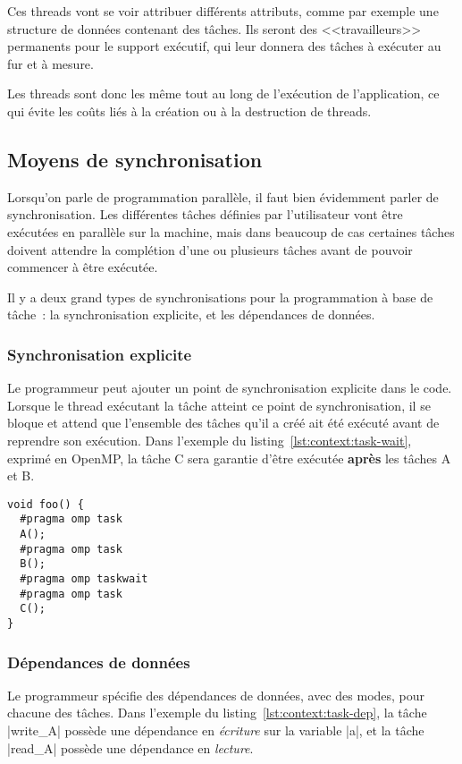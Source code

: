 Ces threads vont se voir attribuer différents attributs, comme par exemple une structure de données contenant des tâches.
Ils seront des <<travailleurs>> permanents pour le support exécutif, qui leur donnera des tâches à exécuter au fur et à mesure.

Les threads sont donc les même tout au long de l'exécution de l'application, ce qui évite les coûts liés à la création ou à la destruction de threads. 


\subsection{Moyens de synchronisation}

Lorsqu'on parle de programmation parallèle, il faut bien évidemment parler de synchronisation.
Les différentes tâches définies par l'utilisateur vont être exécutées en parallèle sur la machine, mais dans beaucoup de cas certaines tâches doivent attendre la complétion d'une ou plusieurs tâches avant de pouvoir commencer à être exécutée.

Il y a deux grand types de synchronisations pour la programmation à base de tâche~: la synchronisation explicite, et les dépendances de données.

\subsubsection{Synchronisation explicite}

Le programmeur peut ajouter un point de synchronisation explicite dans le code.
Lorsque le thread exécutant la tâche atteint ce point de synchronisation, il se bloque et attend que l'ensemble des tâches qu'il a créé ait été exécuté avant de reprendre son exécution. Dans l'exemple du listing~\ref{lst:context:task-wait}, exprimé en OpenMP, la tâche C sera garantie d'être exécutée \textbf{après} les tâches A et B.

\begin{lstlisting}[caption=Synchronisation dans le thread courant (OpenMP),label=lst:context:task-wait]
void foo() {
  #pragma omp task
  A();
  #pragma omp task
  B();
  #pragma omp taskwait
  #pragma omp task
  C();
}
\end{lstlisting}


\subsubsection{Dépendances de données}

Le programmeur spécifie des dépendances de données, avec des modes, pour chacune des tâches.
Dans l'exemple du listing~\ref{lst:context:task-dep}, la tâche |write_A| possède une dépendance en \emph{écriture} sur la variable |a|, et la tâche |read_A| possède une dépendance en \emph{lecture}.

